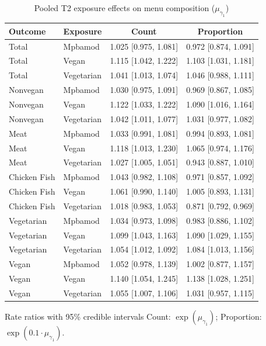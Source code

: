 \begin{table}[H]
\centering
\caption{Pooled T2 exposure effects on menu composition ($\mu_{\gamma_1}$)}
\label{tab:a1_t2_mu_gamma}
\begin{tabular}{llcc}
\toprule
Outcome & Exposure & Count & Proportion \\
\midrule
Total & Mpbamod & 1.025 [0.975, 1.081] & 0.972 [0.874, 1.091] \\
Total & Vegan & 1.115 [1.042, 1.222] & 1.103 [1.031, 1.181] \\
Total & Vegetarian & 1.041 [1.013, 1.074] & 1.046 [0.988, 1.111] \\
Nonvegan & Mpbamod & 1.030 [0.975, 1.091] & 0.969 [0.867, 1.085] \\
Nonvegan & Vegan & 1.122 [1.033, 1.222] & 1.090 [1.016, 1.164] \\
Nonvegan & Vegetarian & 1.042 [1.011, 1.077] & 1.031 [0.977, 1.082] \\
Meat & Mpbamod & 1.033 [0.991, 1.081] & 0.994 [0.893, 1.081] \\
Meat & Vegan & 1.118 [1.013, 1.230] & 1.065 [0.974, 1.176] \\
Meat & Vegetarian & 1.027 [1.005, 1.051] & 0.943 [0.887, 1.010] \\
Chicken Fish & Mpbamod & 1.043 [0.982, 1.108] & 0.971 [0.857, 1.092] \\
Chicken Fish & Vegan & 1.061 [0.990, 1.140] & 1.005 [0.893, 1.131] \\
Chicken Fish & Vegetarian & 1.018 [0.983, 1.053] & 0.871 [0.792, 0.969] \\
Vegetarian & Mpbamod & 1.034 [0.973, 1.098] & 0.983 [0.886, 1.102] \\
Vegetarian & Vegan & 1.099 [1.043, 1.163] & 1.090 [1.029, 1.155] \\
Vegetarian & Vegetarian & 1.054 [1.012, 1.092] & 1.084 [1.013, 1.156] \\
Vegan & Mpbamod & 1.052 [0.978, 1.139] & 1.002 [0.877, 1.157] \\
Vegan & Vegan & 1.140 [1.054, 1.245] & 1.138 [1.028, 1.251] \\
Vegan & Vegetarian & 1.055 [1.007, 1.106] & 1.031 [0.957, 1.115] \\
\bottomrule
\end{tabular}
\par\smallskip\footnotesize Rate ratios with 95\% credible intervals Count: $\exp(\mu_{\gamma_1})$; Proportion: $\exp(0.1 \cdot \mu_{\gamma_1})$.
\end{table}
